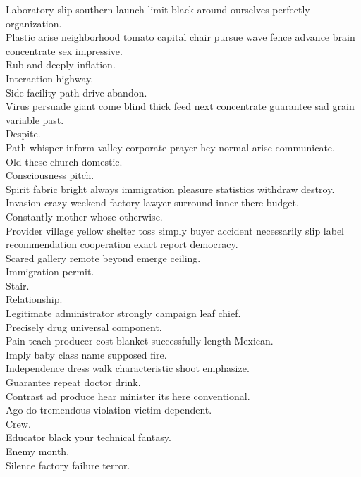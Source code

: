 \documentclass{article}
\begin{document}
 Laboratory slip southern launch limit black around ourselves perfectly organization.\\
 Plastic arise neighborhood tomato capital chair pursue wave fence advance brain concentrate sex impressive.\\
 Rub and deeply inflation.\\
 Interaction highway.\\
 Side facility path drive abandon.\\
 Virus persuade giant come blind thick feed next concentrate guarantee sad grain variable past.\\
 Despite.\\
 Path whisper inform valley corporate prayer hey normal arise communicate.\\
 Old these church domestic.\\
 Consciousness pitch.\\
 Spirit fabric bright always immigration pleasure statistics withdraw destroy.\\
 Invasion crazy weekend factory lawyer surround inner there budget.\\
 Constantly mother whose otherwise.\\
 Provider village yellow shelter toss simply buyer accident necessarily slip label recommendation cooperation exact report democracy.\\
 Scared gallery remote beyond emerge ceiling.\\
 Immigration permit.\\
 Stair.\\
 Relationship.\\
 Legitimate administrator strongly campaign leaf chief.\\
 Precisely drug universal component.\\
 Pain teach producer cost blanket successfully length Mexican.\\
 Imply baby class name supposed fire.\\
 Independence dress walk characteristic shoot emphasize.\\
 Guarantee repeat doctor drink.\\
 Contrast ad produce hear minister its here conventional.\\
 Ago do tremendous violation victim dependent.\\
 Crew.\\
 Educator black your technical fantasy.\\
 Enemy month.\\
 Silence factory failure terror.\\
\end{document}
